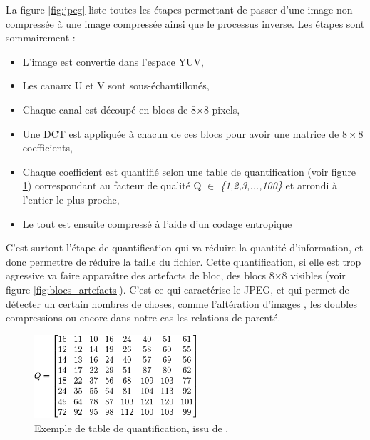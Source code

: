 \documentclass[utf8,final]{stageM2R} %
\begin{document}
La figure \ref{fig:jpeg} liste toutes les étapes permettant de passer d'une image non compressée à une image compressée ainsi que le processus inverse. Les étapes sont sommairement : 

\begin{itemize}
  \item L'image est convertie dans l'espace YUV,
  \item Les canaux U et V sont sous-échantillonés,
  \item Chaque canal est découpé en blocs de 8$\times$8 pixels,
  \item Une DCT est appliquée à chacun de ces blocs pour avoir une matrice de $8\times 8$ coefficients,
  \item Chaque coefficient est quantifié selon une table de quantification (voir figure \ref{fig:quantization_table}) correspondant au facteur de qualité Q $\in$ \textit{\{1,2,3,...,100\}} et arrondi à l'entier le plus proche,
  \item Le tout est ensuite compressé à l'aide d'un codage entropique
\end{itemize}

C'est surtout l'étape de quantification qui va réduire la quantité d'information, et donc permettre de réduire la taille du fichier. Cette quantification, si elle est trop agressive va faire apparaître des artefacts de bloc, des blocs 8$\times$8 visibles (voir figure \ref{fig:blocs_artefacts}). C'est ce qui caractérise le JPEG, et qui permet de détecter un certain nombres de choses, comme l'altération d'images \autocite{bianchi2012image}, les doubles compressions \autocite{bianchi2012detection} ou encore dans notre cas les relations de parenté.

\begin{figure}[H]
  \begin{center}
    \includegraphics[width=60mm]{images/quantization_table.png}
    \caption{Exemple de table de quantification, issu de \autocite{jpeg}.}
    \label{fig:quantization_table}
  \end{center}
\end{figure}
\end{document}
